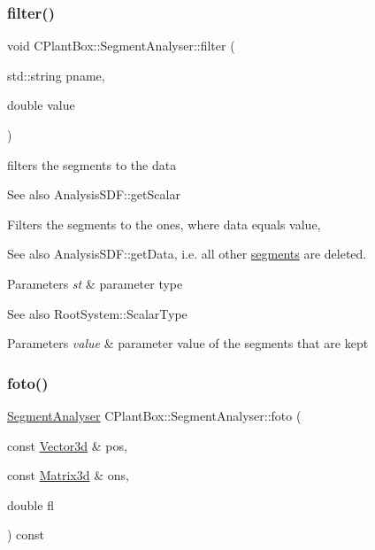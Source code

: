 \subsubsection{\texorpdfstring{filter()}{filter()}\hspace{0.1cm}{\footnotesize\ttfamily [2/2]}}
{\footnotesize\ttfamily void C\+Plant\+Box\+::\+Segment\+Analyser\+::filter (\begin{DoxyParamCaption}\item[{std\+::string}]{pname,  }\item[{double}]{value }\end{DoxyParamCaption})}



filters the segments to the data 

\begin{DoxySeeAlso}{See also}
Analysis\+S\+D\+F\+::get\+Scalar
\end{DoxySeeAlso}
Filters the segments to the ones, where data equals value, \begin{DoxySeeAlso}{See also}
Analysis\+S\+D\+F\+::get\+Data, i.\+e. all other \hyperlink{classCPlantBox_1_1SegmentAnalyser_a2647967365df14fad069aeee7e66ced6}{segments} are deleted.
\end{DoxySeeAlso}

\begin{DoxyParams}{Parameters}
{\em st} & parameter type \\
\hline
\end{DoxyParams}
\begin{DoxySeeAlso}{See also}
Root\+System\+::\+Scalar\+Type 
\end{DoxySeeAlso}

\begin{DoxyParams}{Parameters}
{\em value} & parameter value of the segments that are kept \\
\hline
\end{DoxyParams}
\mbox{\label{classCPlantBox_1_1SegmentAnalyser_a1fab801299f985363e46a4eb6e37e7dd}} 
\subsubsection{\texorpdfstring{foto()}{foto()}}
{\footnotesize\ttfamily \hyperlink{classCPlantBox_1_1SegmentAnalyser}{Segment\+Analyser} C\+Plant\+Box\+::\+Segment\+Analyser\+::foto (\begin{DoxyParamCaption}\item[{const \hyperlink{classCPlantBox_1_1Vector3d}{Vector3d} \&}]{pos,  }\item[{const \hyperlink{classCPlantBox_1_1Matrix3d}{Matrix3d} \&}]{ons,  }\item[{double}]{fl }\end{DoxyParamCaption}) const}




